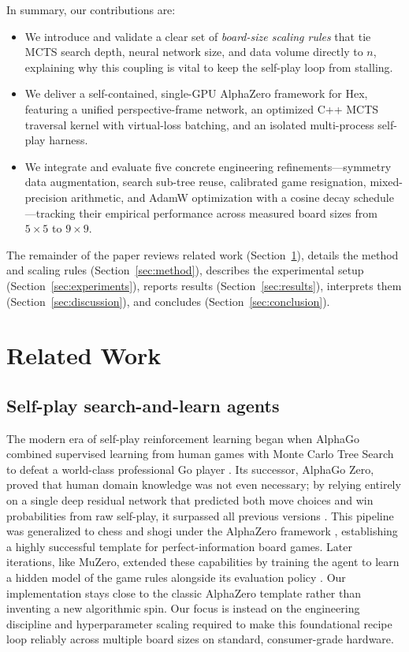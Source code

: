 \documentclass[conference]{IEEEtran}
\begin{document}
In summary, our contributions are:
\begin{itemize}
  \item We introduce and validate a clear set of \emph{board-size scaling rules} that tie MCTS search depth, neural network size, and data volume directly to $n$, explaining why this coupling is vital to keep the self-play loop from stalling.
  \item We deliver a self-contained, single-GPU AlphaZero framework for Hex, featuring a unified perspective-frame network, an optimized C++ MCTS traversal kernel with virtual-loss batching, and an isolated multi-process self-play harness.
  \item We integrate and evaluate five concrete engineering refinements---symmetry data augmentation, search sub-tree reuse, calibrated game resignation, mixed-precision arithmetic, and AdamW optimization with a cosine decay schedule---tracking their empirical performance across measured board sizes from $5\times5$ to $9\times9$.
\end{itemize}
The remainder of the paper reviews related work (Section~\ref{sec:related}), details the method and scaling rules (Section~\ref{sec:method}), describes the experimental setup (Section~\ref{sec:experiments}), reports results (Section~\ref{sec:results}), interprets them (Section~\ref{sec:discussion}), and concludes (Section~\ref{sec:conclusion}).

\section{Related Work}
\label{sec:related}

\subsection{Self-play search-and-learn agents}
The modern era of self-play reinforcement learning began when AlphaGo combined supervised learning from human games with Monte Carlo Tree Search to defeat a world-class professional Go player \cite{silver2016mastering}. Its successor, AlphaGo Zero, proved that human domain knowledge was not even necessary; by relying entirely on a single deep residual network that predicted both move choices and win probabilities from raw self-play, it surpassed all previous versions \cite{silver2017mastering}. This pipeline was generalized to chess and shogi under the AlphaZero framework \cite{silver2018general}, establishing a highly successful template for perfect-information board games. Later iterations, like MuZero, extended these capabilities by training the agent to learn a hidden model of the game rules alongside its evaluation policy \cite{schrittwieser2020mastering}. Our implementation stays close to the classic AlphaZero template rather than inventing a new algorithmic spin. Our focus is instead on the engineering discipline and hyperparameter scaling required to make this foundational recipe loop reliably across multiple board sizes on standard, consumer-grade hardware.
\end{document}
